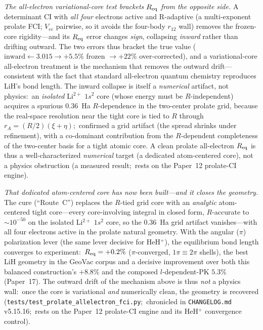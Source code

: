 \documentclass[aps,pra,twocolumn,superscriptaddress,longbibliography]{revtex4-2}
\begin{document}
\emph{The all-electron variational-core test brackets $R_{\rm eq}$ from the
opposite side.}  A determinant CI with \emph{all four} electrons active and
R-adaptive (a multi-exponent prolate FCI; $V_{ee}$ pairwise, so it avoids the
four-body $r_{12}$ wall) removes the frozen-core rigidity---and its $R_{\rm eq}$
error changes \emph{sign}, collapsing \emph{inward} rather than drifting outward.
The two errors thus bracket the true value ($\text{inward}\leftarrow 3.015\to
+5.5\%$ frozen $\to +22\%$ over-corrected), and a variational-core all-electron
treatment is the mechanism that removes the outward drift---consistent with the
fact that standard all-electron quantum chemistry reproduces LiH's bond length.
The inward collapse is itself a \emph{numerical} artifact, not physics:\ an
\emph{isolated} Li$^{2+}$ $1s^2$ core (whose energy must be $R$-independent)
acquires a spurious $0.36$~Ha $R$-dependence in the two-center prolate grid,
because the real-space resolution near the tight core is tied to $R$ through
$r_A=(R/2)(\xi+\eta)$;\ confirmed a grid artifact (the spread shrinks under
refinement), with a co-dominant contribution from the $R$-dependent completeness
of the two-center basis for a tight atomic core.  A clean prolate all-electron
$R_{\rm eq}$ is thus a well-characterized \emph{numerical} target (a dedicated
atom-centered core), not a physics obstruction (a measured result;\ rests on the
Paper~12 prolate-CI engine).

\emph{That dedicated atom-centered core has now been built---and it closes the
geometry.}  The cure (``Route~C'') replaces the $R$-tied grid core with an
\emph{analytic} atom-centered tight core---every core-involving integral in closed
form, $R$-accurate to ${\sim}10^{-50}$ on the isolated Li$^{2+}$ $1s^2$ core, so
the $0.36$~Ha grid artifact vanishes---with all four electrons active in the
prolate natural geometry.  With the angular ($\pi$) polarization lever (the same
lever decisive for HeH$^+$), the equilibrium bond length converges to experiment:\
$R_{\rm eq} = +0.2\%$ ($\pi$-converged, $1\pi \equiv 2\pi$ shells), the best LiH
geometry in the GeoVac corpus and a decisive improvement over both this balanced
construction's $+8.8\%$ and the composed $l$-dependent-PK $5.3\%$ (Paper~17).  The
outward drift of the mechanism above is thus \emph{not} a physics wall:\ once the
core is variational \emph{and} numerically clean, the geometry is recovered
(\texttt{tests/test\_prolate\_allelectron\_fci.py};\ chronicled in
\texttt{CHANGELOG.md} v5.15.16;\ rests on the Paper~12 prolate-CI engine and its
HeH$^+$ convergence control).
\end{document}
